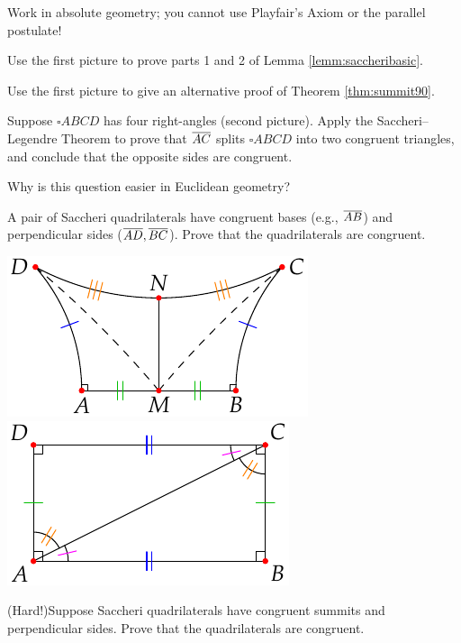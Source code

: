 \begin{exercises}
	Work in absolute geometry; you cannot use Playfair's Axiom or the parallel postulate!
	\begin{enumerate}
		\begin{minipage}[t]{0.66\linewidth}\vspace{-2pt}
		  \item Use the first picture to prove parts 1 and 2 of Lemma \ref{lemm:saccheribasic}.

		  \item Use the first picture to give an alternative proof of Theorem \ref{thm:summit90}.
		
			\item\label{exs:rectanglesplit} Suppose $\square ABCD$ has four right-angles (second picture). Apply the Saccheri--Legendre Theorem to prove that $\overline{AC}$ splits $\square ABCD$ into two congruent triangles, and conclude that the opposite sides are congruent.\par
			Why is this question easier in Euclidean geometry?
	
			\item\label{exs:saccherisplit} A pair of Saccheri quadrilaterals have congruent bases (e.g., $\overline{AB}$) and perpendicular sides ($\overline{AD},\overline{BC}$). Prove that the quadrilaterals are congruent.
		\end{minipage}
		\hfill
		\begin{minipage}[t]{0.32\linewidth}\vspace{-8pt}
			\flushright\includegraphics[scale=0.9]{history-saccheri2}\\
			\includegraphics[scale=0.9]{basic-rect}
		\end{minipage}	
		    		
			\item (Hard!)\lstsp Suppose Saccheri quadrilaterals have congruent summits and perpendicular sides. Prove that the quadrilaterals are congruent.
	\end{enumerate}

\end{exercises}

